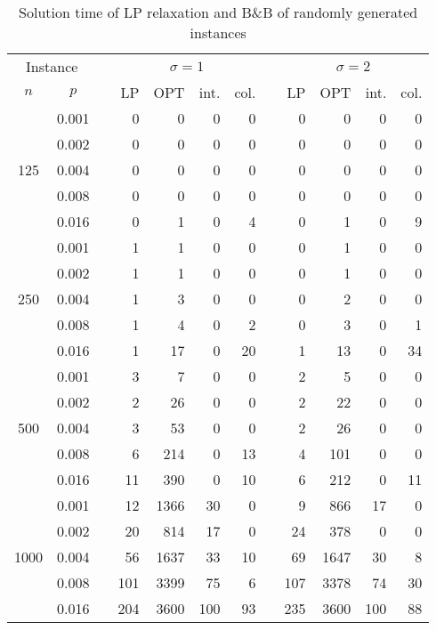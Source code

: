 \begin{table}[]
\begin{tabular}{ccrrrrrrrrrr}
\multicolumn{2}{c}{Instance} & & \multicolumn{4}{c}{$\sigma=1$} & &\multicolumn{4}{c}{$\sigma=2$} \\
\cline{1-2}\cline{4-7}\cline{9-12}
$n$ & $p$ & & LP  & OPT & int. & col.& & LP  & OPT & int. & col. \\
\hline
\multirow{5}{*}{125}       
 & 0.001 & &0   &  0 & 0 & 0 & & 0  &  0 &  0  &  0 \\ 
 & 0.002 & &0   &  0 & 0 & 0 & & 0  &  0 &  0  &  0 \\
 & 0.004 & &0   &  0 & 0 & 0 & & 0  &  0 &  0  &  0 \\
 & 0.008 & &0   &  0 & 0 & 0 & & 0  &  0 &  0  &  0 \\
 & 0.016 & &0   &  1 & 0 & 4 & & 0  &  1 &  0  &  9 \\
\hline                         
\multirow{5}{*}{250}                               
 & 0.001 & & 1  &  1 & 0 & 0 & & 0  &  1 & 0   & 0  \\
 & 0.002 & & 1  &  1 & 0 & 0 & & 0  &  1 & 0   & 0  \\
 & 0.004 & & 1  &  3 & 0 & 0 & & 0  &  2 & 0   & 0  \\
 & 0.008 & & 1  &  4 & 0 & 2 & & 0  &  3 & 0   & 1  \\
 & 0.016 & & 1  & 17 & 0 &20 & & 1  & 13 & 0   &34  \\
\hline                         
\multirow{5}{*}{500}                               
 & 0.001 & & 3   &  7 & 0 & 0 & & 2  &  5 & 0   & 0  \\
 & 0.002 & & 2   & 26 & 0 & 0 & & 2  & 22 & 0   & 0  \\
 & 0.004 & & 3   & 53 & 0 & 0 & & 2  & 26 & 0   & 0  \\
 & 0.008 & & 6   &214 & 0 &13 & & 4  &101 & 0   & 0  \\
 & 0.016 & &11   &390 & 0 &10 & & 6  &212 & 0   &11  \\
\hline                         
\multirow{5}{*}{1000}                               
 & 0.001 & & 12  &1366& 30& 0 & & 9  &866   & 17 & 0 \\
 & 0.002 & & 20  & 814& 17& 0 & & 24 &378   & 0  & 0 \\
 & 0.004 & & 56  &1637& 33&10 & & 69 &1647  & 30 & 8 \\
 & 0.008 & &101  &3399& 75& 6 & & 107&3378  & 74 &30 \\
 & 0.016 & &204  &3600&100&93 & & 235&3600  &100 &88 
\end{tabular}
\caption{Solution time of LP relaxation and B\&B of randomly generated instances}
\label{tab:soltime}
\end{table}
			 

